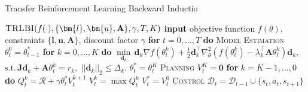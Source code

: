 \begin{algorithm}[ht!]
\caption{Transfer Reinforcement Learning Backward Inductio}\label{alg:trlbi}
\begin{algorithmic}
\State 
\State ${\textsc{TRLBI}(f(\cdot), \{\bm{l}, \bm{u}, \mathbf{A}\}, \gamma, T, K)}$
\State \hspace{0.5cm}\textbf{input} objective function $f(\theta)$, constraints $\{\bm{l}, \bm{u}, \mathbf{A}\}$, discount factor $\gamma$
\State \hspace{0.5cm}\textbf{for} $t=0, \hdots, T$ \textbf{do}
\State \hspace{1.0cm}\textsc{Model Estimation}
\State \hspace{1.0cm}$\theta_t^0 = \theta_{t-1}^{*}$
\State \hspace{1.0cm}\textbf{for} $k=0, \hdots, K$ \textbf{do}
\State \hspace{1.5cm}$\underset{\bm{d}_k}{\min} \, \bm{d}_k \nabla f(\theta_t^k)+\frac{1}{2}\bm{d}_k^\top \nabla^2_\theta(f(\theta_t^k)-\lambda_k^\top\mathbf{A}\theta_t^k)\bm{d}_k,$
\State \hspace{2.0cm}$\textrm{s.t.} \, \mathbf{J}\bm{d}_k + \mathbf{A}\theta_t^k =r_k,$
\State \hspace{2.5cm}$||\bm{d}_k||_2 \leq \Delta_k.$
\State \hspace{1.0cm}$\theta_t^{*} = \theta_t^K$
\State
\State \hspace{1.0cm}\textsc{Planning}
\State \hspace{1.0cm}$V_t^K = \bm{0}$
\State \hspace{1.0cm}\textbf{for} $k=K-1, \hdots, 0$ \textbf{do}
\State \hspace{1.5cm}$Q^k_t = \mathcal{R}+\gamma \theta_t^{*}V^{k+1}_t$
\State \hspace{1.5cm}$V^k_t = \max Q^k_t$
\State \hspace{1.0cm}$V^{*}_t = V_t^0$
\State
\State \hspace{1.0cm}\textsc{Control}
\State \hspace{1.0cm}$\mathcal{D}_t = \mathcal{D}_{t-1} \cup \{s_t, a_t, s_{t+1}\}$
\end{algorithmic}
\end{algorithm}

